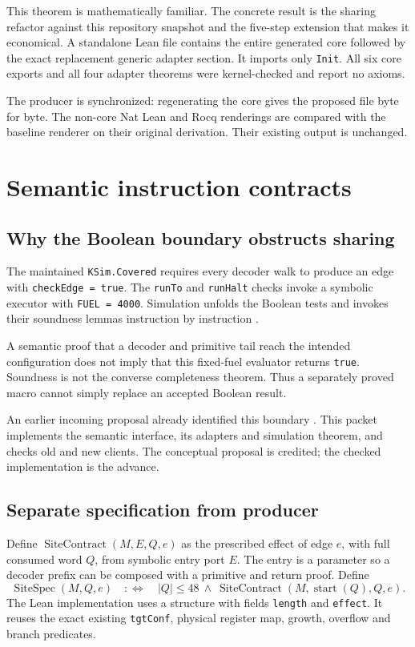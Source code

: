 \documentclass[11pt,letterpaper]{article}
\newcommand{\Spec}{\operatorname{SiteSpec}}
\newcommand{\Contract}{\operatorname{SiteContract}}
\newcommand{\code}[1]{\texttt{#1}}
\begin{document}
This theorem is mathematically familiar. The concrete result is the sharing
refactor against this repository snapshot and the five-step extension that
makes it economical. A standalone Lean file contains the entire generated core
followed by the exact replacement generic adapter section. It imports only
\code{Init}. All six core exports and all four adapter theorems were kernel-checked
and report no axioms.

The producer is synchronized: regenerating the core gives the proposed file
byte for byte. The non-core Nat Lean and Rocq renderings are compared with the
baseline renderer on their original derivation. Their existing output is unchanged.

\section{Semantic instruction contracts}
\label{sec:sites}

\subsection{Why the Boolean boundary obstructs sharing}

The maintained \code{KSim.Covered} requires every decoder walk to produce an edge
with \code{checkEdge = true}. The \code{runTo} and \code{runHalt} checks invoke
a symbolic executor with \code{FUEL = 4000}. Simulation unfolds the Boolean tests
and invokes their soundness lemmas instruction by instruction \cite{ksim}.

A semantic proof that a decoder and primitive tail reach the intended
configuration does not imply that this fixed-fuel evaluator returns
\code{true}. Soundness is not the converse completeness theorem. Thus a separately
proved macro cannot simply replace an accepted Boolean result.

An earlier incoming proposal already identified this boundary
\cite{prior-contracts}. This packet implements the semantic interface,
its adapters and simulation theorem, and checks old and new clients.
The conceptual proposal is credited; the checked implementation is the advance.

\subsection{Separate specification from producer}

Define \(\Contract(M,E,Q,e)\) as the prescribed effect of edge \(e\), with full
consumed word \(Q\), from symbolic entry port \(E\). The entry is a parameter
so a decoder prefix can be composed with a primitive and return proof. Define
\[
 \Spec(M,Q,e)\quad:\Longleftrightarrow\quad
 |Q|\le48\ \land\ \Contract(M,\operatorname{start}(Q),Q,e).
\]
The Lean implementation uses a structure with fields \code{length} and
\code{effect}. It reuses the exact existing \code{tgtConf}, physical register
map, growth, overflow and branch predicates.
\end{document}
